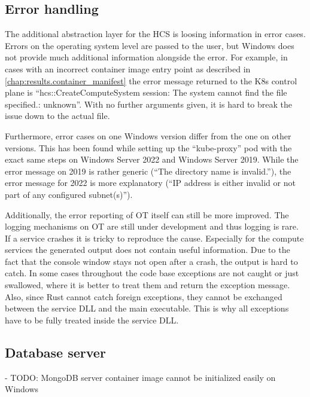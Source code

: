 \subsection{Error handling}
The additional abstraction layer for the \ac{HCS} is loosing information in error cases. Errors on the operating system level are passed to the user, but \ac{Windows} does not provide much additional information alongside the error. For example, in cases with an incorrect container image entry point as described in \autoref{chap:results.container_manifest} the error message returned to the \ac{K8s} control plane is \enquote{hcs::CreateComputeSystem session: The system cannot find the file specified.: unknown}. With no further arguments given, it is hard to break the issue down to the actual file.

Furthermore, error cases on one \ac{Windows} version differ from the one on other versions. This has been found while setting up the \enquote{kube-proxy} pod with the exact same steps on Windows Server 2022 and Windows Server 2019. While the error message on 2019 is rather generic (\enquote{The directory name is invalid.}), the error message for 2022 is more explanatory (\enquote{IP address is either invalid or not part of any configured subnet(s)}).

Additionally, the error reporting of \ac{OT} itself can still be more improved. The logging mechanisms on \ac{OT} are still under development and thus logging is rare. If a service crashes it is tricky to reproduce the cause. Especially for the compute services the generated output does not contain useful information. Due to the fact that the console window stays not open after a crash, the output is hard to catch.
In some cases throughout the code base exceptions are not caught or just swallowed, where it is better to treat them and return the exception message.
Also, since Rust cannot catch foreign exceptions, they cannot be exchanged between the service \ac{DLL} and the main executable. This is why all exceptions have to be fully treated inside the service \ac{DLL}. 


\subsection{Database server}

- TODO: MongoDB server container image cannot be initialized easily on Windows



